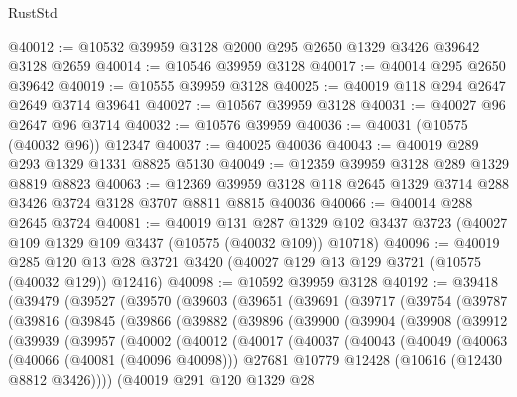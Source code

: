 \begin{lexlean}{RustStd}
\begin{coremodule}
@40012 := @10532 @39959 @3128 @2000 @295 @2650 @1329 @3426 @39642 @3128 @2659
@40014 := @10546 @39959 @3128
@40017 := @40014 @295 @2650 @39642
@40019 := @10555 @39959 @3128
@40025 := @40019 @118 @294 @2647 @2649 @3714 @39641
@40027 := @10567 @39959 @3128
@40031 := @40027 @96 @2647 @96 @3714
@40032 := @10576 @39959
@40036 := @40031 (@10575 (@40032 @96)) @12347
@40037 := @40025 @40036
@40043 := @40019 @289 @293 @1329 @1331 @8825 @5130
@40049 := @12359 @39959 @3128 @289 @1329 @8819 @8823
@40063 := @12369 @39959 @3128 @118 @2645 @1329 @3714 @288 @3426 @3724 @3128 @3707 @8811 @8815 @40036
@40066 := @40014 @288 @2645 @3724
@40081 := @40019
    @131
    @287
    @1329
    @102
    @3437
    @3723
    (@40027 @109 @1329 @109 @3437 (@10575 (@40032 @109)) @10718)
@40096 := @40019
    @285
    @120
    @13
    @28
    @3721
    @3420
    (@40027 @129 @13 @129 @3721 (@10575 (@40032 @129)) @12416)
@40098 := @10592 @39959 @3128
@40192 := @39418
    (@39479
      (@39527
        (@39570
          (@39603
            (@39651
              (@39691
                (@39717
                  (@39754
                    (@39787
                      (@39816
                        (@39845
                          (@39866
                            (@39882
                              (@39896
                                (@39900
                                  (@39904
                                    (@39908
                                      (@39912
                                        (@39939
                                          (@39957
                                            (@40002
                                              (@40012
                                                (@40017
                                                  (@40037
                                                    (@40043
                                                      (@40049
                                                        (@40063
                                                          (@40066 (@40081 (@40096 @40098)))
                                                          @27681
                                                          @10779
                                                          @12428
                                                          (@10616 (@12430 @8812 @3426))))
                                                      (@40019
                                                        @291
                                                        @120
                                                        @1329
                                                        @28

\end{coremodule}
\end{lexlean}
